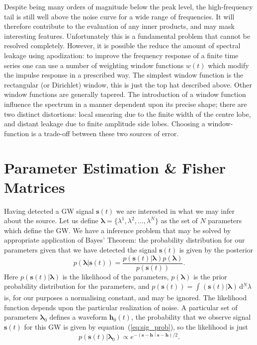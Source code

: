 \documentclass[a4paper, 11pt, titlepage, twoside]{report}
\newcommand{\eqnref}[1]{equation~(\ref{eq:#1})}
\newcommand{\innerprod}[2]{\ensuremath{\left({#1}\middle|{#2}\right)}}
\newcommand{\dd}{\ensuremath{\mathrm{d}}}
\newcommand{\intd}[4]{\ensuremath{\int_{#1}^{#2}{#3}\,\dd{#4}}}
\begin{document}
{Despite being many orders of magnitude below the peak level, the high-frequency tail is still well above the noise curve for a wide range of frequencies. It will therefore contribute to the evaluation of any inner products, and may mask interesting features. Unfortunately this is a fundamental problem that cannot be resolved completely. However, it is possible the reduce the amount of spectral leakage using apodization: to improve the frequency response of a finite time series one can use a number of weighting window functions $w(t)$ which modify the impulse response in a prescribed way. The simplest window function is the rectangular (or Dirichlet) window, this is just the top hat described above. Other window functions are generally tapered. The introduction of a window function influence the spectrum in a manner dependent upon its precise shape; there are two distinct distortions: local smearing due to the finite width of the centre lobe, and distant leakage due to finite amplitude side lobes. Choosing a window-function is a trade-off between these two sources of error.

\section{Parameter Estimation \& Fisher Matrices}

Having detected a GW signal $\boldsymbol{s}(t)$ we are interested in what we may infer about the source. Let us define $\boldsymbol{\lambda} = \{\lambda^1, \lambda^2, \ldots, \lambda^N\}$ as the set of $N$ parameters which define the GW. We have a inference problem that may be solved by appropriate application of Bayes' Theorem\cite{Jaynes2003}: the probability distribution for our parameters given that we have detected the signal $\boldsymbol{s}(t)$ is given by the posterior
\begin{equation}
p(\boldsymbol{\lambda}|\boldsymbol{s}(t)) = \frac{p(\boldsymbol{s}(t)|\boldsymbol{\lambda})p(\boldsymbol{\lambda})}{p(\boldsymbol{s}(t))}.
\end{equation}
Here $p(\boldsymbol{s}(t)|\boldsymbol{\lambda})$ is the likelihood of the parameters, $p(\boldsymbol{\lambda})$ is the prior probability distribution for the parameters, and $p(\boldsymbol{s}(t)) = \intd{}{}{(\boldsymbol{s}(t)|\boldsymbol{\lambda})}{^N \lambda}$ is, for our purposes a normalising constant, and may be ignored. The likelihood function depends upon the particular realization of noise. A particular set of parameters $\boldsymbol{\lambda}_0$ defines a waveform $\boldsymbol{h}_0(t)$, the probability that we observe signal $\boldsymbol{s}(t)$ for this GW is given by \eqnref{sig_prob}, so the likelihood is just
\begin{equation}
p(\boldsymbol{s}(t)|\boldsymbol{\lambda}_0) \propto e^{-\innerprod{\boldsymbol{s}-\boldsymbol{h}}{\boldsymbol{s}-\boldsymbol{h}}/2}.
\end{equation}




}
\end{document}
